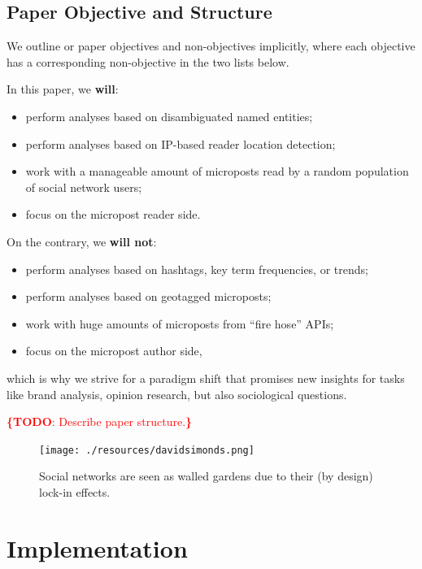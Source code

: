 \documentclass{iosart2c}
\newcommand{\todo}[1]{\noindent\textcolor{red}{{\bf \{TODO}: #1{\bf \}}}}
\begin{document}
\subsection{Paper Objective and Structure}
We outline or paper objectives and non-objectives implicitly, where  each objective has a corresponding non-objective in the two lists below.

\noindent In this paper, we \textbf{will}:
\begin{itemize}%
	\item perform analyses based on disambiguated named entities;
	\item perform analyses based on IP-based reader location detection;
	\item work with a manageable amount of microposts read by a random population of social network users;
	\item focus on the micropost reader side.
\end{itemize}
On the contrary, we \textbf{will not}:
\begin{itemize}%
	\item perform analyses based on hashtags, key term frequencies, or trends;
	\item perform analyses based on geotagged microposts;
	\item work with huge amounts of microposts from ``fire hose'' APIs;
	\item focus on the micropost author side,
\end{itemize}
which is why we strive for a paradigm shift that promises new insights for tasks like brand analysis, opinion research, but also sociological questions.

\todo{Describe paper structure.}

\begin{figure}
\centering
\texttt{[image: ./resources/davidsimonds.png]}
\caption{Social networks are seen as walled gardens due to their (by design) lock-in effects.~\cite{DavidSimonds}}
\label{fig:DavidSimonds}
\end{figure}

\section{Implementation} \label{sec:implementation}
\end{document}
